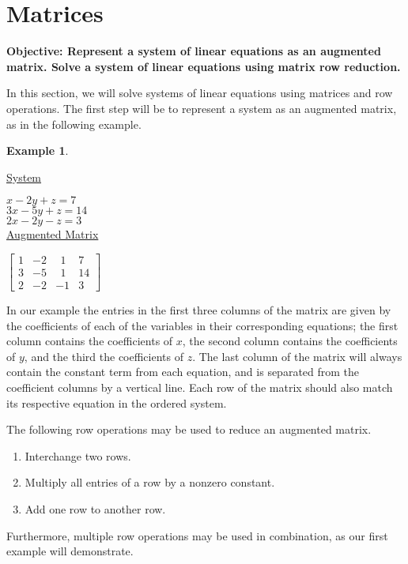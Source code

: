 \documentclass[12pt]{book}
\theoremstyle{definition}
\newtheorem{example}{Example}
\begin{document}
\section{Matrices}
{\bf Objective: Represent a system of linear equations as an augmented matrix.  Solve a system of linear equations using matrix row reduction.}\par
In this section, we will solve systems of linear equations using matrices and row operations.  The first step will be to represent a system as an augmented matrix, as in the following example.
\begin{example}
\end{example}
\begin{center}
\begin{multicols}{2}
\underline{System}\par
$x-2y+z=7$\\
$3x-5y+z=14$\\
$2x-2y-z=3$\\
\underline{Augmented Matrix}\par
$\left[\begin{array}{ccc|c}
1 & -2 & ~~1 & 7\\
3 & -5 & ~~1 & 14\\
2 & -2 & -1 & 3~
\end{array}\right]$
\end{multicols}
\end{center}
In our example the entries in the first three columns of the matrix are given by the coefficients of each of the variables in their corresponding equations; the first column contains the coefficients of $x$, the second column contains the coefficients of $y$, and the third the coefficients of $z$.  The last column of the matrix will always contain the constant term from each equation, and is separated from the coefficient columns by a vertical line.  Each row of the matrix should also match its respective equation in the ordered system.\par
The following row operations may be used to reduce an augmented matrix.
\begin{enumerate}
	\item Interchange two rows.
	\item Multiply all entries of a row by a nonzero constant.
	\item Add one row to another row.
\end{enumerate}
Furthermore, multiple row operations may be used in combination, as our first example will demonstrate.\par
\end{document}
